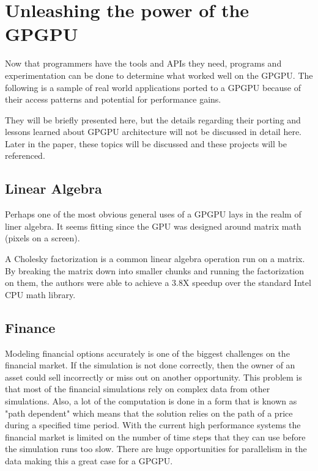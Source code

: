 \section*{Unleashing the power of the GPGPU}


Now that programmers have the tools and APIs they need, programs and experimentation can be done to determine what worked well on the GPGPU. The following is a sample of real world applications ported to a GPGPU because of their access patterns and potential for performance gains. 

They will be briefly presented here, but the details regarding their porting and lessons learned about GPGPU architecture will not be discussed in detail here. Later in the paper, these topics will be discussed and these projects will be referenced. 

\subsection*{Linear Algebra}

Perhaps one of the most obvious general uses of a GPGPU lays in the realm of liner algebra. It seems fitting since the GPU was designed around matrix math (pixels on a screen). 

A Cholesky factorization is a common linear algebra operation run on a matrix. By breaking the matrix down into smaller chunks and running the factorization on them, the authors were able to achieve a 3.8X speedup over the standard Intel CPU math library. \cite{linearalg}

\subsection*{Finance}

Modeling financial options accurately is one of the biggest challenges on the financial market. If the simulation is not done correctly, then the owner of an asset could sell incorrectly or miss out on another opportunity. This problem is that most of the financial simulations rely on complex data from other simulations. Also, a lot of the computation is done in a form that is known as "path dependent" which means that the solution relies on the path of a price during a specified time period. With the current high performance systems the financial market is limited on the number of time steps that they can use before the simulation runs too slow. There are huge opportunities for parallelism in the data making this a great case for a GPGPU. 

